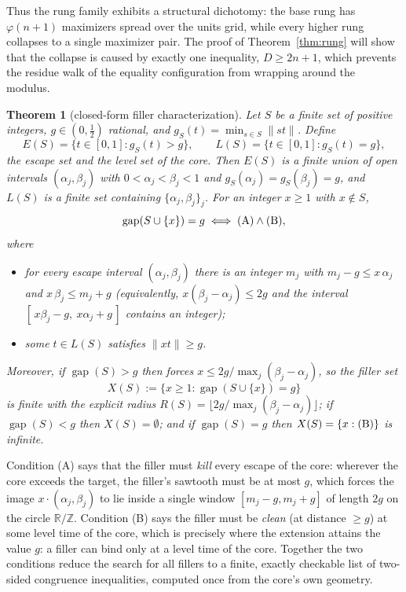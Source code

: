 \documentclass[11pt,a4paper]{article}
\theoremstyle{plain}
\newtheorem{theorem}{Theorem}[section]
\theoremstyle{definition}
\theoremstyle{remark}
\newcommand{\norm}[1]{\lVert #1 \rVert}
\newcommand{\gap}{\operatorname{gap}}
\newcommand{\R}{\mathbb{R}}
\newcommand{\Z}{\mathbb{Z}}
\begin{document}
Thus the rung family exhibits a structural dichotomy: the base rung has
$\varphi(n+1)$ maximizers spread over the units grid, while every higher
rung collapses to a single maximizer pair. The proof of
Theorem~\ref{thm:rung} will show that the collapse is caused by exactly one
inequality, $D \ge 2n+1$, which prevents the residue walk of the equality
configuration from wrapping around the modulus.

\begin{theorem}[closed-form filler characterization]\label{thm:filler}
Let $S$ be a finite set of positive integers, $g \in (0,\tfrac12)$ rational,
and $g_S(t) = \min_{s \in S} \norm{st}$. Define
\[
  E(S) = \{ t \in [0,1] : g_S(t) > g \}, \qquad
  L(S) = \{ t \in [0,1] : g_S(t) = g \},
\]
the \emph{escape set} and the \emph{level set} of the core. Then $E(S)$ is a
finite union of open intervals $(\alpha_j, \beta_j)$ with $0 < \alpha_j <
\beta_j < 1$ and $g_S(\alpha_j) = g_S(\beta_j) = g$, and $L(S)$ is a finite
set containing $\{\alpha_j, \beta_j\}_j$. For an integer $x \ge 1$ with
$x \notin S$,
\[
  \gap(S \cup \{x\}) = g
  \iff
  \text{\rm(A)} \wedge \text{\rm(B)},
\]
where
\begin{itemize}[leftmargin=*]
\item[\text{\rm(A)}] for every escape interval $(\alpha_j, \beta_j)$ there is
  an integer $m_j$ with $m_j - g \le x\,\alpha_j$ and $x\,\beta_j \le m_j + g$
  (equivalently, $x(\beta_j - \alpha_j) \le 2g$ and the interval
  $[\,x\beta_j - g,\ x\alpha_j + g\,]$ contains an integer);
\item[\text{\rm(B)}] some $t \in L(S)$ satisfies $\norm{xt} \ge g$.
\end{itemize}
Moreover, if $\gap(S) > g$ then  forces
$x \le 2g / \max_j (\beta_j - \alpha_j)$, so the filler set
\[
  X(S) := \{ x \ge 1 : \gap(S \cup \{x\}) = g \}
\]
is finite with the explicit radius $R(S) = \bigl\lfloor 2g /
\max_j(\beta_j - \alpha_j) \bigr\rfloor$; if $\gap(S) < g$ then $X(S) =
\emptyset$; and if $\gap(S) = g$ then $X(S) = \{x : \text{\rm(B)}\}$ is
infinite.
\end{theorem}

Condition (A) says that the filler must \emph{kill} every escape of the core:
wherever the core exceeds the target, the filler's sawtooth must be at most
$g$, which forces the image $x \cdot (\alpha_j, \beta_j)$ to lie inside a
single window $[m_j - g, m_j + g]$ of length $2g$ on the circle $\R/\Z$.
Condition (B) says the filler must be \emph{clean} (at distance $\ge g$) at
some level time of the core, which is precisely where the extension attains
the value $g$: a filler can bind only at a level time of the core. Together
the two conditions reduce the search for all fillers to a finite, exactly
checkable list of two-sided congruence inequalities, computed once from the
core's own geometry.
\end{document}
